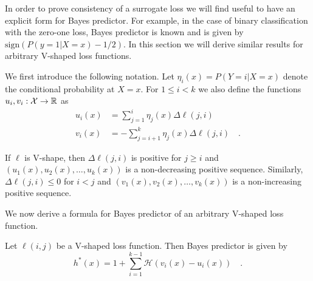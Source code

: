 In order to prove consistency of a surrogate loss we will find useful to have an explicit form for Bayes predictor. For example, in the case of binary classification with the zero-one loss, Bayes predictor is known and is given by ${\text{sign}(P(y\!=\!1|X\!=\!x) - 1/2)}$. In this section we will derive similar results for arbitrary V-shaped loss functions. 


We first introduce the following notation. Let $\eta_i(x) = {P(Y=i|X\!=\!x)}$ denote the conditional probability at $X\!=\!x$. For  $1 \leq i< k$ we also define the functions  $u_i, v_i: \mathcal{X} \to {\mathbb R}$ as
\begin{equation}
\begin{aligned}
u_i(x) &= \sum_{j=1}^{i}\eta_j(x) \Delta\ell(j, i) \\
v_i(x) &= -\sum_{j=i+1}^{k}\eta_j(x) \Delta\ell(j, i) \quad .
\end{aligned}
\label{eq:u_v}
\end{equation}


If $\ell$ is V-shape, then $\Delta\ell(j, i)$ is positive for $j \geq i$ and $(u_1(x), u_2(x), \ldots, u_k(x))$ is a non-decreasing positive sequence. Similarly, $\Delta\ell(j, i) \leq 0$ for $i < j$ and $(v_1(x), v_2(x), \ldots, v_k(x))$ is a non-increasing positive sequence.




We now derive a formula for Bayes predictor of an arbitrary V-shaped loss function.


\begin{theorem} Let $\ell(i, j)$ be a V-shaped loss function. Then Bayes predictor is given by
\begin{equation}
h^*(x) = 1 + \sum_{i=1}^{k-1} \mathcal{H}(v_i (x) - u_i(x)) \quad.
\label{eq:bayes_predicto}
\end{equation}

\end{theorem}


